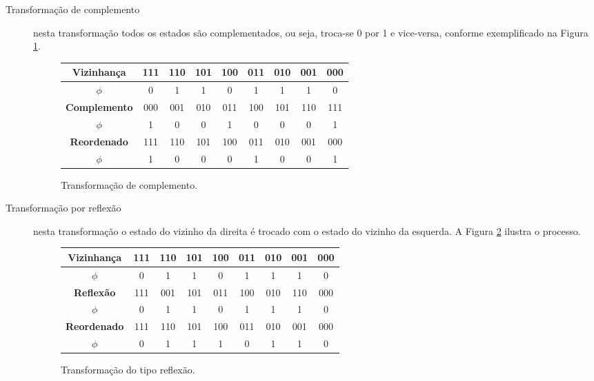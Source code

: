 \documentclass[12pt,a4paper]{article}
\begin{document}
\begin{description}

\item[Transformação de complemento] nesta transformação todos os estados são complementados,
ou seja, troca-se 0 por 1 e vice-versa, conforme exemplificado na Figura \ref{fig:complement}.

\begin{figure}[htp]
\begin{center}
\begin{tabular}{|c|c|c|c|c|c|c|c|c|}
\hline
\Large \textbf{Vizinhança}  & 111 & 110 & 101 & 100 & 011 & 010 & 001 & 000 \\ \hline
\Large \textbf{$\phi$}      &  0  &  1  &  1  &  0  &  1  &  1  &  1  &  0  \\ \hline
\hline
\Large \textbf{Complemento} & 000 & 001 & 010 & 011 & 100 & 101 & 110 & 111 \\ \hline
\Large \textbf{$\phi$}      &  1  &  0  &  0  &  1  &  0  &  0  &  0  &  1  \\ \hline
\hline
\Large \textbf{Reordenado}  & 111 & 110 & 101 & 100 & 011 & 010 & 001 & 000 \\ \hline
\Large \textbf{$\phi$}      &  1  &  0  &  0  &  0  &  1  &  0  &  0  &  1  \\ \hline
\end{tabular}
\caption{Transformação de complemento.}
\label{fig:complement}
\end{center}
\end{figure}

\item[Transformação por reflexão] nesta transformação o estado do vizinho da direita é
trocado com o estado do vizinho da esquerda. A Figura \ref{fig:reflex} ilustra o processo.

\begin{figure}[htp]
\begin{center}
\begin{tabular}{|c|c|c|c|c|c|c|c|c|}
\hline
\Large \textbf{Vizinhança}  & 111 & 110 & 101 & 100 & 011 & 010 & 001 & 000 \\ \hline
\Large \textbf{$\phi$}      &  0  &  1  &  1  &  0  &  1  &  1  &  1  &  0  \\ \hline
\hline
\Large \textbf{Reflexão}    & 111 & 001 & 101 & 011 & 100 & 010 & 110 & 000 \\ \hline
\Large \textbf{$\phi$}      &  0  &  1  &  1  &  0  &  1  &  1  &  1  &  0  \\ \hline
\hline
\Large \textbf{Reordenado}  & 111 & 110 & 101 & 100 & 011 & 010 & 001 & 000 \\ \hline
\Large \textbf{$\phi$}      &  0  &  1  &  1  &  1  &  0  &  1  &  1  &  0  \\ \hline
\end{tabular}
\caption{Transformação do tipo reflexão.}
\label{fig:reflex}
\end{center}
\end{figure}


\end{description}
\end{document}
